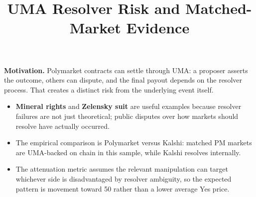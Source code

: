 \documentclass[aspectratio=169,10pt]{beamer}
\title{UMA Resolver Risk and Matched-Market Evidence}
\author{}
\date{}
\newcommand{\tightitem}{\setlength\itemsep{0.25em}}
\begin{document}
\begin{frame}
\small
\textbf{Motivation.} Polymarket contracts can settle through UMA: a proposer asserts the outcome, others can dispute, and the final payout depends on the resolver process. That creates a distinct risk from the underlying event itself.

\vspace{1.0em}
\begin{itemize}
\tightitem
\item \textbf{Mineral rights} and \textbf{Zelensky suit} are useful examples because resolver failures are not just theoretical; public disputes over how markets should resolve have actually occurred.
\item The empirical comparison is Polymarket versus Kalshi: matched PM markets are UMA-backed on chain in this sample, while Kalshi resolves internally.
\item The attenuation metric assumes the relevant manipulation can target whichever side is disadvantaged by resolver ambiguity, so the expected pattern is movement toward 50 rather than a lower average Yes price.
\end{itemize}
\end{frame}
\end{document}
